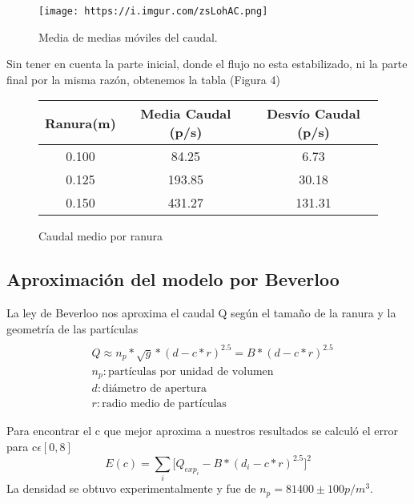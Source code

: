 \documentclass{article}
\begin{document}
\begin{figure}[!h]
  \centerline{\texttt{[image: https://i.imgur.com/zsLohAC.png]}}
  \caption{Media de medias móviles del caudal.}
  \label{fig:boat1}
\end{figure}

\newpage
Sin tener en cuenta la parte inicial, donde el flujo no esta estabilizado, ni la parte final por la misma razón, obtenemos la tabla (Figura 4)
\begin{figure}[!h]
\begin{center}
\begin{tabular}{ |c|c|c| } 
 \hline
 Ranura(m) & Media Caudal (p/s) & Desvío Caudal (p/s) \\ 
 \hline
 0.100 & 84.25 & 6.73 \\ 
 \hline
 0.125 & 193.85 & 30.18 \\ 
 \hline
 0.150 & 431.27 & 131.31 \\ 
 \hline
\end{tabular}
\end{center}
\caption{Caudal medio por ranura}
\label{fig:boat1}
\end{figure}

\subsection{Aproximación del modelo por Beverloo}
La ley de Beverloo nos aproxima el caudal Q según el tamaño de la ranura y la geometría de las partículas
\begin{equation}
    \begin{aligned}
    \\&Q\approx n_p *\sqrt{g}*(d - c*r)^{2.5} = B* (d - c*r)^{2.5}
    \\&n_p: \textrm{part\'iculas por unidad de volumen}
    \\&d: \textrm{di\'ametro de apertura}
    \\&r: \textrm{radio medio de part\'iculas}
    \end{aligned}
\end{equation}

Para encontrar el c que mejor aproxima a nuestros resultados se calculó el error para c\begin{math}\epsilon[0,8]\end{math} 
\begin{equation}
    E(c) = \sum_i \Big[Q_{exp_i} - B * (d_i - c*r)^{2.5}\Big]^2
\end{equation}
La densidad se obtuvo experimentalmente y fue de \begin{math}n_p=81400±100 p/m^3\end{math}.
\end{document}
